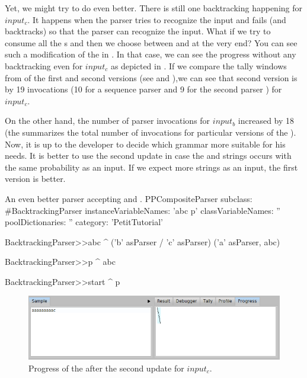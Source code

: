 \documentclass[a4paper,10pt,twoside]{book}
\begin{document}

Yet, we might try to do even better.
There is still one backtracking happening for $input_c$.
It happens when the parser  tries to recognize the  input and fails (and backtracks) so that the parser  can recognize the  input.
What if we try to consume all the s and then we choose between  and  at the very end?
You can see such a modification of the  in .
In that case, we can see the progress without any backtracking even for $input_c$ as depicted in .
If we compare the tally windows from of the first and second versions (see  and ),we can see that second version is by 19 invocations (10 for a sequence parser and 9 for the second parser ) for $input_c$.

On the other hand, the number of parser invocations for $input_b$ increased by 18 (the  summarizes the total number of invocations for particular versions of the ).
Now, it is up to the developer to decide which grammar more suitable for his needs. 
It is better to use the second update in case the  and  strings occurs with the same probability as an input.
If we expect more  strings as an input, the first version is better.

\begin{script}{An even better parser accepting  and . \label{scr:pp/backtrackingParser-update-2}}
PPCompositeParser subclass: #BacktrackingParser
	instanceVariableNames: 'abc p'
	classVariableNames: ''
	poolDictionaries: ''
	category: 'PetitTutorial'

BacktrackingParser>>abc
  ^  ('b' asParser / 'c' asParser)
     ('a' asParser, abc)

BacktrackingParser>>p 
  ^ abc

BacktrackingParser>>start 
  ^ p
\end{script}


\begin{figure}
  \begin{center}
    \includegraphics[width=\linewidth]{example-progressAaac-update-2}
    \caption{Progress of the  after the second update for $input_c$. \label{fig:pp/example-progressAaac-update-2}}
  \end{center}
\end{figure}
\end{document}
